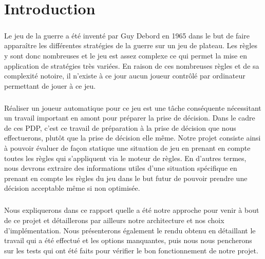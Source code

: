 
\chapter{Introduction}


	\paragraph{}
	Le jeu de la guerre a été inventé par Guy Debord en 1965 dans le but de faire apparaître les différentes stratégies de la guerre sur un jeu de plateau. 
	Les règles y sont donc nombreuses et le jeu est assez complexe ce qui permet la mise en application de stratégies très variées.
	En raison de ces nombreuses règles et de sa complexité notoire, il n'existe à ce jour aucun joueur contrôlé par ordinateur permettant de jouer à ce jeu.
	
	\paragraph{}
	Réaliser un joueur automatique pour ce jeu est une tâche conséquente nécessitant un travail important en amont pour préparer la prise de décision.
	Dans le cadre de ces PDP, c'est ce travail de préparation à la prise de décision que nous effectuerons, plutôt que la prise de décision elle même.
	Notre projet consiste ainsi à pouvoir évaluer de façon statique une situation de jeu en prenant en compte toutes les règles qui s'appliquent via le moteur de règles.
	En d'autres termes, nous devrons extraire des informations utiles d'une situation spécifique en prenant en compte les règles du jeu dans le but futur de pouvoir prendre une décision acceptable même si non optimisée.
	
	\paragraph{}
	Nous expliquerons dans ce rapport quelle a été notre approche pour venir à bout de ce projet et détaillerons par ailleurs notre architecture et nos
	choix d'implémentation. Nous présenterons également le rendu obtenu en détaillant le travail qui a été effectué et les options manquantes, puis
	nous nous pencherons sur les tests qui ont été faits pour vérifier le bon fonctionnement de notre projet.
